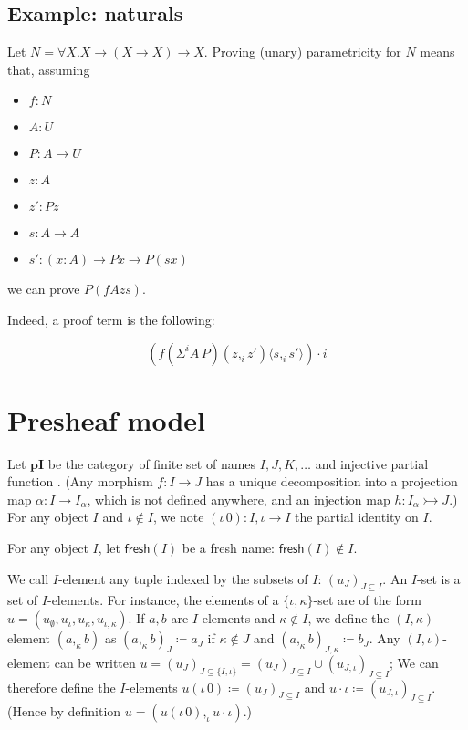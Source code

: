 \documentclass[english]{PaperTools/latex/lipics}
\newcommand\CP[3]{(#2,_{#1} #3)}
\newcommand\param[1]{\!\cdot\!#1}
\newcommand\ip[3]{Σ^{#1} {#2}\,{#3}}
\newcommand\fp[3]{⟨#2 ,_{#1} #3⟩}
\def\pI{\ensuremath{\mathbf{pI}}}
\def\fresh#1{\mathsf{fresh}(#1)}
\begin{document}
\subsection{Example: naturals}
Let $N = ∀X. X → (X → X) → X$.
Proving (unary) parametricity for $N$ means that, assuming
\begin{itemize}
\item $f : N$
\item $A : U$
\item $P : A → U$
\item $z : A$
\item $z' : P z$
\item $s : A → A$
\item $s' : (x:A) → P x → P (s x)$
\end{itemize}
we can prove $P (f A z s)$.

Indeed, a proof term is the following:

\[
(f (\ip i A P) \CP i z {z'} \fp i s {s'}) \param i
\]

\section{Presheaf model}

\begin{definition}
  Let \pI{} be the category of finite set of names $I,J,K,…$ and injective
  partial function \cite[ex.~9.7 p.~176]{PittsAM:nomsns}.
  (Any morphism $f : I → J$ has a unique decomposition into a projection map
  $α : I → I_α$, which is not defined anywhere, and an injection map $h : I_α ↣ J$.)
  For any object $I$ and $ι ∉ I$, we note $(ι \, 0) : I,ι → I$ the partial
  identity on $I$.


  For any object $I$, let $\fresh{I}$ be a fresh name: $\fresh{I} ∉ I$.
\end{definition}

\begin{definition}
  We call $I$-element any tuple indexed by the subsets of $I$: $(u_J)_{J ⊆ I}$.
  An $I$-set is a set of $I$-elements.  For instance, the elements of a
  $\{ι,κ\}$-set are of the form $u = (u_∅,u_ι,u_κ,u_{ι,κ})$.
  If $a,b$ are $I$-elements and $κ ∉ I$, we define the $(I,κ)$-element
  $(a ,_κ b)$ as $(a ,_κ b)_J ≔ a_J$ if $κ ∉ J$ and $(a ,_κ b)_{J,κ} ≔ b_J$.
  Any $(I,ι)$-element can be written $u = (u_J)_{J ⊆ \{I,ι\}} = (u_J)_{J ⊆ I} ∪ (u_{J,ι})_{J ⊆ I}$;
  We can therefore define the $I$-elements $u (ι\,0) ≔ (u_J)_{J ⊆ I}$ and $u · ι ≔ (u_{J,ι})_{J ⊆ I}$.
  (Hence by definition $u = (u (ι\,0) ,_ι u · ι)$.)
\end{definition}
\end{document}
